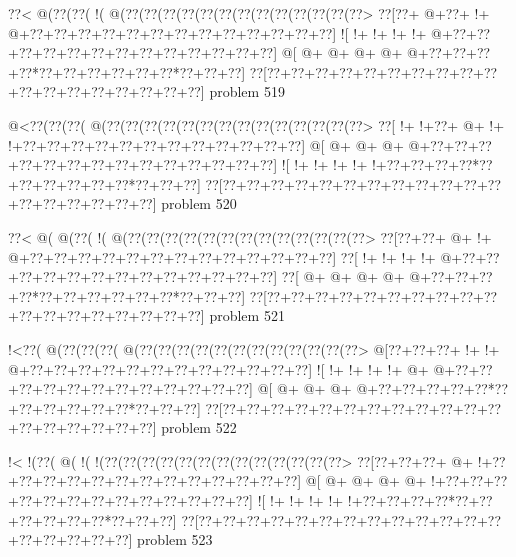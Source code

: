 \vbox{\vbox{\goo
\0??<\- @(\0??(\0??(\- !(\- @(\0??(\0??(\0??(\0??(\0??(\0??(\0??(\0??(\0??(\0??(\0??(\0??(\0??>
\0??[\0??+\- @+\0??+\- !+\- @+\0??+\0??+\0??+\0??+\0??+\0??+\0??+\0??+\0??+\0??+\0??+\0??+\0??]
\- ![\- !+\- !+\- !+\- !+\- @+\0??+\0??+\0??+\0??+\0??+\0??+\0??+\0??+\0??+\0??+\0??+\0??+\0??]
\- @[\- @+\- @+\- @+\- @+\- @+\0??+\0??+\0??+\0??*\0??+\0??+\0??+\0??+\0??+\0??*\0??+\0??+\0??]
\0??[\0??+\0??+\0??+\0??+\0??+\0??+\0??+\0??+\0??+\0??+\0??+\0??+\0??+\0??+\0??+\0??+\0??+\0??]
}
\hfil problem 519\hfil\break
}



\vbox{\vbox{\goo
\- @<\0??(\0??(\0??(\- @(\0??(\0??(\0??(\0??(\0??(\0??(\0??(\0??(\0??(\0??(\0??(\0??(\0??(\0??>
\0??[\- !+\- !+\0??+\- @+\- !+\- !+\0??+\0??+\0??+\0??+\0??+\0??+\0??+\0??+\0??+\0??+\0??+\0??]
\- @[\- @+\- @+\- @+\- @+\0??+\0??+\0??+\0??+\0??+\0??+\0??+\0??+\0??+\0??+\0??+\0??+\0??+\0??]
\- ![\- !+\- !+\- !+\- !+\- !+\0??+\0??+\0??+\0??*\0??+\0??+\0??+\0??+\0??+\0??*\0??+\0??+\0??]
\0??[\0??+\0??+\0??+\0??+\0??+\0??+\0??+\0??+\0??+\0??+\0??+\0??+\0??+\0??+\0??+\0??+\0??+\0??]
}
\hfil problem 520\hfil\break
}



\vbox{\vbox{\goo
\0??<\- @(\- @(\0??(\- !(\- @(\0??(\0??(\0??(\0??(\0??(\0??(\0??(\0??(\0??(\0??(\0??(\0??(\0??>
\0??[\0??+\0??+\- @+\- !+\- @+\0??+\0??+\0??+\0??+\0??+\0??+\0??+\0??+\0??+\0??+\0??+\0??+\0??]
\0??[\- !+\- !+\- !+\- !+\- @+\0??+\0??+\0??+\0??+\0??+\0??+\0??+\0??+\0??+\0??+\0??+\0??+\0??]
\0??[\- @+\- @+\- @+\- @+\- @+\0??+\0??+\0??+\0??*\0??+\0??+\0??+\0??+\0??+\0??*\0??+\0??+\0??]
\0??[\0??+\0??+\0??+\0??+\0??+\0??+\0??+\0??+\0??+\0??+\0??+\0??+\0??+\0??+\0??+\0??+\0??+\0??]
}
\hfil problem 521\hfil\break
}



\vbox{\vbox{\goo
\- !<\0??(\- @(\0??(\0??(\0??(\- @(\0??(\0??(\0??(\0??(\0??(\0??(\0??(\0??(\0??(\0??(\0??(\0??>
\- @[\0??+\0??+\0??+\- !+\- !+\- @+\0??+\0??+\0??+\0??+\0??+\0??+\0??+\0??+\0??+\0??+\0??+\0??]
\- ![\- !+\- !+\- !+\- !+\- @+\- @+\0??+\0??+\0??+\0??+\0??+\0??+\0??+\0??+\0??+\0??+\0??+\0??]
\- @[\- @+\- @+\- @+\- @+\0??+\0??+\0??+\0??+\0??*\0??+\0??+\0??+\0??+\0??+\0??*\0??+\0??+\0??]
\0??[\0??+\0??+\0??+\0??+\0??+\0??+\0??+\0??+\0??+\0??+\0??+\0??+\0??+\0??+\0??+\0??+\0??+\0??]
}
\hfil problem 522\hfil\break
}



\vbox{\vbox{\goo
\- !<\- !(\0??(\- @(\- !(\- !(\0??(\0??(\0??(\0??(\0??(\0??(\0??(\0??(\0??(\0??(\0??(\0??(\0??>
\0??[\0??+\0??+\0??+\- @+\- !+\0??+\0??+\0??+\0??+\0??+\0??+\0??+\0??+\0??+\0??+\0??+\0??+\0??]
\- @[\- @+\- @+\- @+\- @+\- !+\0??+\0??+\0??+\0??+\0??+\0??+\0??+\0??+\0??+\0??+\0??+\0??+\0??]
\- ![\- !+\- !+\- !+\- !+\- !+\0??+\0??+\0??+\0??*\0??+\0??+\0??+\0??+\0??+\0??*\0??+\0??+\0??]
\0??[\0??+\0??+\0??+\0??+\0??+\0??+\0??+\0??+\0??+\0??+\0??+\0??+\0??+\0??+\0??+\0??+\0??+\0??]
}
\hfil problem 523\hfil\break
}



